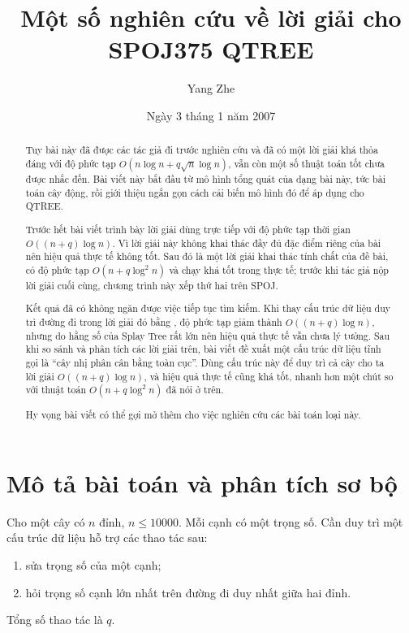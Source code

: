 \documentclass[11pt]{article}
\title{Một số nghiên cứu về lời giải cho SPOJ375 QTREE}
\author{Yang Zhe}
\date{Ngày 3 tháng 1 năm 2007}
\begin{document}
\maketitle

\begin{abstract}
Tuy bài này đã được các tác giả đi trước nghiên cứu \cite{zhou} và đã có một
lời giải khá thỏa đáng với độ phức tạp
$O(n\log n + q\sqrt n\log n)$, vẫn còn một số thuật toán tốt chưa được nhắc
đến. Bài viết này bắt đầu từ mô hình tổng quát của dạng bài này, tức bài toán
cây động, rồi giới thiệu ngắn gọn cách cải biến mô hình đó để áp dụng cho
QTREE.

Trước hết bài viết trình bày lời giải dùng trực tiếp  với
độ phức tạp thời gian $O((n+q)\log n)$. Vì lời giải này không khai thác đầy đủ
đặc điểm riêng của bài nên hiệu quả thực tế không tốt. Sau đó là một lời giải
khai thác tính chất của đề bài, có độ phức tạp $O(n+q\log^2 n)$ và chạy khá
tốt trong thực tế; trước khi tác giả nộp lời giải cuối cùng, chương trình này
xếp thứ hai trên SPOJ.

Kết quả đã có không ngăn được việc tiếp tục tìm kiếm. Khi thay cấu trúc dữ liệu
duy trì đường đi trong lời giải đó bằng , độ phức tạp giảm
thành $O((n+q)\log n)$, nhưng do hằng số của Splay Tree rất lớn nên hiệu quả
thực tế vẫn chưa lý tưởng. Sau khi so sánh và phân tích các lời giải trên,
bài viết đề xuất một cấu trúc dữ liệu tĩnh gọi là ``cây nhị phân cân bằng toàn
cục''. Dùng cấu trúc này để duy trì cả cây cho ta lời giải
$O((n+q)\log n)$, và hiệu quả thực tế cũng khá tốt, nhanh hơn một chút so với
thuật toán $O(n+q\log^2 n)$ đã nói ở trên.

Hy vọng bài viết có thể gợi mở thêm cho việc nghiên cứu các bài toán loại này.
\end{abstract}

\tableofcontents

\section{Mô tả bài toán và phân tích sơ bộ}

Cho một cây có $n$ đỉnh, $n\le 10000$. Mỗi cạnh có một trọng số. Cần duy trì
một cấu trúc dữ liệu hỗ trợ các thao tác sau:
\begin{enumerate}
  \item sửa trọng số của một cạnh;
  \item hỏi trọng số cạnh lớn nhất trên đường đi duy nhất giữa hai đỉnh.
\end{enumerate}
Tổng số thao tác là $q$.
\end{document}
